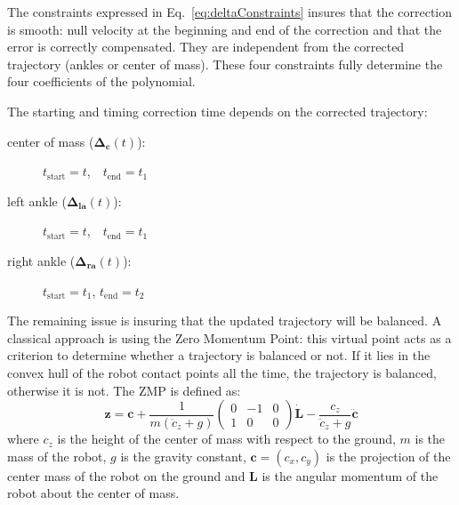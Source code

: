 The constraints expressed in Eq.~\ref{eq:deltaConstraints} insures
that the correction is smooth: null velocity at the beginning and end
of the correction and that the error is correctly compensated. They
are independent from the corrected trajectory (ankles or center of
mass). These four constraints fully determine the four coefficients of
the polynomial.

The starting and timing correction time depends on the corrected trajectory:
\begin{description}
\item[center of mass ($\mathbf{\Delta_c}(t)$):]\hspace{3cm}
  $t_{\text{start}} = t$,~~$t_{\text{end}} = t_1$
\item[left ankle ($\mathbf{\Delta_{\text{la}}}(t)$):]\hspace{3cm}
  $t_{\text{start}} = t$,~~$t_{\text{end}} = t_1$
\item[right ankle ($\mathbf{\Delta_{\text{ra}}}(t)$):]\hspace{3cm}
  $t_{\text{start}} = t_1$, $t_{\text{end}} = t_2$
\end{description}


The remaining issue is insuring that the updated trajectory will be
balanced. A classical approach is using the Zero Momentum Point: this
virtual point acts as a criterion to determine whether a trajectory is
balanced or not. If it lies in the convex hull of the robot contact
points all the time, the trajectory is balanced, otherwise it is
not. The ZMP is defined as:
%
\begin{equation} \label{eq:zmp1}
  \mathbf{z} = \mathbf{c} + \frac{1}{m(\ddot{c}_z +
    g)}\left(\begin{array}{ccc} 0 &-1 &0\\1 &0 &0\end{array}\right)
    \mathbf{\dot{\textbf{L}}} - \frac{c_z}{\ddot{c}_z + g}
    \ddot{\mathbf{c}}
\end{equation}
%
where $c_z$ is the height of the center of mass with respect to the
ground, $m$ is the mass of the robot, $g$ is the gravity constant,
\mbox{$\mathbf{c}=(c_x,c_y)$} is the projection of the center mass of
the robot on the ground and $\textbf{L}$ is the angular momentum of
the robot about the center of mass.


